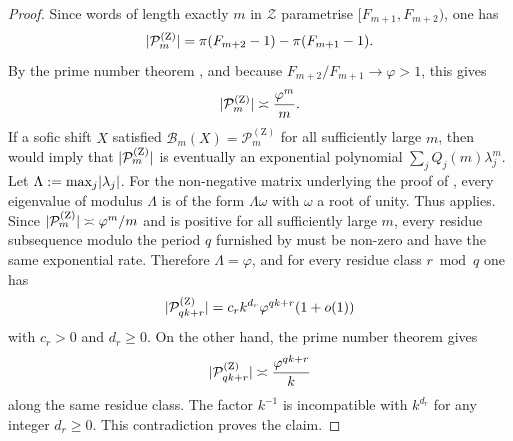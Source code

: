 \begin{proof}
  Since words of length exactly \(m\) in \(\mathcal Z\) parametrise
  \([F_{m+1},F_{m+2})\), one has
  \[
    \lvert \mathcal P_m^{(\mathrm Z)} \rvert
    =\pi(F_{m+2}-1)-\pi(F_{m+1}-1).
  \]
  By the prime number theorem \cite{HardyWright2008}, and because
  \(F_{m+2}/F_{m+1}\to\varphi>1\), this gives
  \[
    \lvert \mathcal P_m^{(\mathrm Z)} \rvert\asymp\frac{\varphi^m}{m}.
  \]
  If a sofic shift \(X\) satisfied
  \(\mathcal B_m(X)=\mathcal P_m^{(\mathrm Z)}\) for all sufficiently
  large \(m\), then 
  would imply that \(\lvert \mathcal P_m^{(\mathrm Z)} \rvert\) is eventually an
  exponential polynomial \(\sum_jQ_j(m)\lambda_j^m\). Let
  \(\Lambda:=\max_j\lvert \lambda_j \rvert\). For the non-negative matrix
  underlying the proof of
  , every eigenvalue of
  modulus \(\Lambda\) is of the form \(\Lambda\omega\) with \(\omega\) a
  root of unity. Thus
   applies. Since
  \(\lvert \mathcal P_m^{(\mathrm Z)} \rvert\asymp\varphi^m/m\) and is positive
  for all sufficiently large \(m\), every residue subsequence modulo
  the period \(q\) furnished by
   must be non-zero and have the
  same exponential rate. Therefore \(\Lambda=\varphi\), and for every
  residue class \(r\bmod q\) one has
  \[
    \lvert \mathcal P_{qk+r}^{(\mathrm Z)} \rvert
    =c_r k^{d_r}\varphi^{qk+r}(1+o(1))
  \]
  with \(c_r>0\) and \(d_r\ge 0\). On the other hand, the prime number
  theorem gives
  \[
    \lvert \mathcal P_{qk+r}^{(\mathrm Z)} \rvert
    \asymp\frac{\varphi^{qk+r}}{k}
  \]
  along the same residue class. The factor \(k^{-1}\) is incompatible
  with \(k^{d_r}\) for any integer \(d_r\ge 0\). This contradiction
  proves the claim.
\end{proof}
